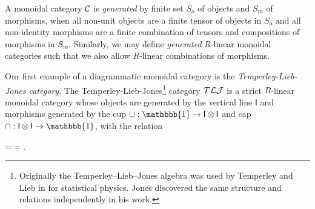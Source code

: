 \begin{definition}
    A monoidal category $\mathcal{C}$ is \textit{generated} by finite set $S_o$ of objects and $S_m$ of morphisms, when all non-unit objects are a finite tensor of objects in $S_o$ and all non-identity morphisms are a finite combination of tensors and compositions of morphisms in $S_m$. Similarly, we may define \textit{generated} $R$-linear monoidal categories such that we also allow $R$-linear combinations of morphisms.
\end{definition}

\begin{example}
    \label{eg:tlj-category}
    Our first example of a diagrammatic monoidal category is the \textit{Temperley-Lieb-Jones category}. The Temperley-Lieb-Jones\footnote{Originally the Temperley--Lieb--Jones algebra was used by Temperley and Lieb in \cite{temperley-lieb-algebra-lattices} for statistical physics. Jones discovered the same structure and relations independently in his work.} category $\mathcal{TLJ}$ is a strict $R$-linear monoidal category whose objects are generated by the vertical line $\mathsf{I}$ and morphisms generated by the cup $\cup: \mathbbb{1} \to \mathsf{I} \tensor \mathsf{I}$ and cap $\cap: \mathsf{I} \tensor \mathsf{I} \to \mathbbb{1}$, with the relation
    \begin{center}
        = 
        = .
    \end{center}





\end{example}



















